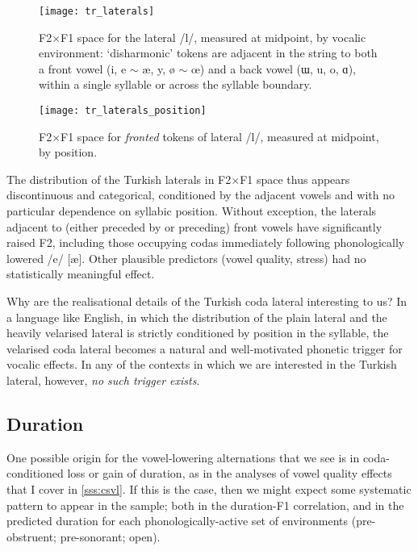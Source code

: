 \begin{figure}[H]
  \centering
  \texttt{[image: tr\_laterals]}
  \caption[F2$\times$F1 distribution for the lateral /l/ by vocalic environment.]{F2$\times$F1 space for the lateral /l/, measured at midpoint, by vocalic environment: `disharmonic' tokens are adjacent in the string to both a front vowel (i, e $\sim$ æ, y, ø $\sim$ œ) and a back vowel (ɯ, u, o, ɑ), within a single syllable or across the syllable boundary.}
  \label{fig:trlateral}
\end{figure}

\begin{figure}[H]
  \centering
  \texttt{[image: tr\_laterals\_position]}
  \caption[F2$\times$F1 distribution for fronted /l/ by syllabic position.]{F2$\times$F1 space for \textit{fronted} tokens of lateral /l/, measured at midpoint, by position.}
  \label{fig:trlateral_pos}
\end{figure}

The distribution of the Turkish laterals in F2$\times$F1 space thus appears discontinuous and categorical, conditioned by the adjacent vowels and with no particular dependence on syllabic position. Without exception, the laterals adjacent to (either preceded by or preceding) front vowels have significantly raised F2, including those occupying codas immediately following phonologically lowered /e/ [\ae]. Other plausible predictors (vowel quality, stress) had no statistically meaningful effect.

Why are the realisational details of the Turkish coda lateral interesting to us? In a language like English, in which the distribution of the plain lateral and the heavily velarised lateral is strictly conditioned by position in the syllable, the velarised coda lateral becomes a natural and well-motivated phonetic trigger for vocalic effects. In any of the contexts in which we are interested in the Turkish lateral, however, \emph{no such trigger exists}.

\subsection{Duration}\label{ss:trduration}

One possible origin for the vowel-lowering alternations that we see is in coda-conditioned loss or gain of duration, as in the analyses of vowel quality effects that I cover in \cref{sss:csvl}. If this is the case, then we might expect some systematic pattern to appear in the sample; both in the duration-F1 correlation, and in the predicted duration for each phonologically-active set of environments (pre-obstruent; pre-sonorant; open).

